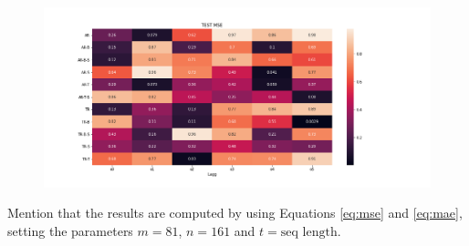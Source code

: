 \begin{table}[h]
    \centering
    \caption{Configuration of \acrshort{ar}-models. $\times$ denoted not applied, \checked denotes applied. \textbf{Bruk denne for tre eksempler, gjør de mer ulike, velg gjerne best ++ .}}
    \label{tab:ar_model_config}
\end{table}

\begin{figure}
    \centering
    \includegraphics[scale = 0.5]{python_figs/MSE_score_AR_models.png}
    \label{fig:results_ar_models}
\end{figure}

Mention that the results are computed by using Equations \eqref{eq:mse} and \eqref{eq:mae}, setting the parameters $m = 81$, $n=161$ and $t=\text{seq length}$. 


